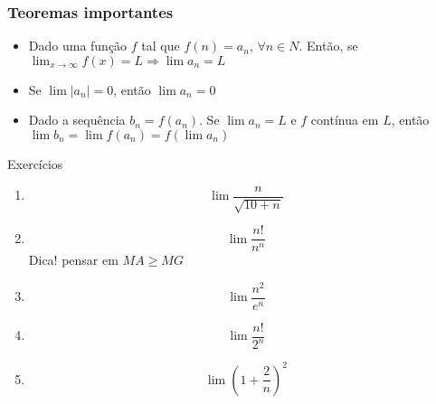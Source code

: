 

\subsubsection*{Teoremas importantes}

\begin{itemize}
    \item Dado uma função $f$ tal que $f(n) = a_n$, $\forall n \in N$. Então, se $\displaystyle \lim_{x \rightarrow \infty} f(x) = L \Longrightarrow \lim a_n = L$
    \item Se $\lim |a_n| = 0$, então $\lim a_n = 0$
    \item Dado a sequência $b_n = f(a_n)$. Se $\lim a_n = L$ e $f$ contínua em $L$, então $\lim b_n = \lim f(a_n) = f(\lim a_n)$
\end{itemize}

Exercícios

\begin{multicols}{2}
    \begin{enumerate}
        \item \[ \lim \frac{n}{\sqrt{10 + n}} \]
        \item \[ \lim \frac{n!}{n^n} \] Dica! pensar em $MA \geq MG$
        \item \[ \lim \frac{n^2}{e^n} \]
        \item \[ \lim \frac{n!}{2^n} \]
        \item \[ \lim \left( 1 + \frac{2}{n} \right)^2 \]
    \end{enumerate}
\end{multicols}